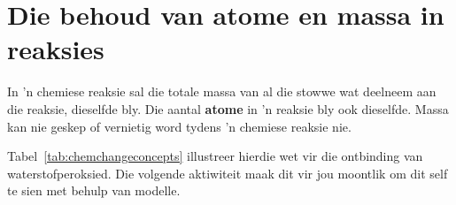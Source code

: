     \label{m38711*cid5}
            \section{Die behoud van atome en massa in reaksies}
            \nopagebreak
      \label{m38711*id64489}In 'n chemiese reaksie sal die totale massa van al die stowwe wat deelneem aan die reaksie, dieselfde bly. Die aantal  \textbf{atome} in 'n reaksie bly ook dieselfde. Massa kan nie geskep of vernietig word tydens 'n chemiese reaksie nie. \par 


Tabel~\ref{tab:chemchangeconcepts} illustreer hierdie wet vir die ontbinding van waterstofperoksied. Die volgende aktiwiteit maak dit vir jou moontlik om dit self te sien met behulp van modelle.
